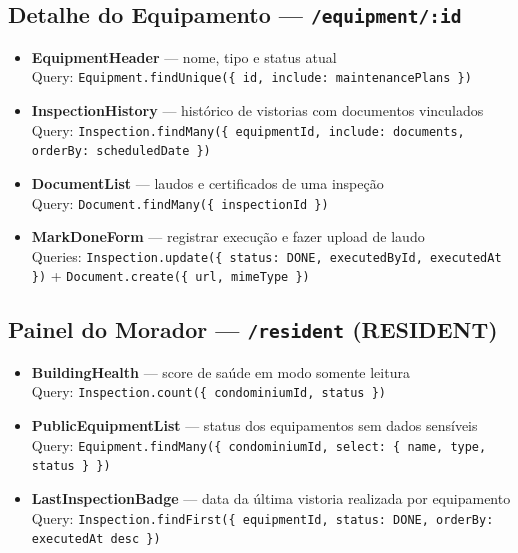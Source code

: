 \documentclass[12pt, a4paper]{article}
\begin{document}
\subsection{Detalhe do Equipamento — \texttt{/equipment/:id}}

\begin{itemize}[leftmargin=1.5em]
    \item \textbf{EquipmentHeader} — nome, tipo e status atual \\
          Query: \texttt{Equipment.findUnique(\{ id, include: maintenancePlans \})}
    \item \textbf{InspectionHistory} — histórico de vistorias com documentos vinculados \\
          Query: \texttt{Inspection.findMany(\{ equipmentId, include: documents, orderBy: scheduledDate \})}
    \item \textbf{DocumentList} — laudos e certificados de uma inspeção \\
          Query: \texttt{Document.findMany(\{ inspectionId \})}
    \item \textbf{MarkDoneForm} — registrar execução e fazer upload de laudo \\
          Queries: \texttt{Inspection.update(\{ status: DONE, executedById, executedAt \})} + \texttt{Document.create(\{ url, mimeType \})}
\end{itemize}

\subsection{Painel do Morador — \texttt{/resident} (RESIDENT)}

\begin{itemize}[leftmargin=1.5em]
    \item \textbf{BuildingHealth} — score de saúde em modo somente leitura \\
          Query: \texttt{Inspection.count(\{ condominiumId, status \})}
    \item \textbf{PublicEquipmentList} — status dos equipamentos sem dados sensíveis \\
          Query: \texttt{Equipment.findMany(\{ condominiumId, select: \{ name, type, status \} \})}
    \item \textbf{LastInspectionBadge} — data da última vistoria realizada por equipamento \\
          Query: \texttt{Inspection.findFirst(\{ equipmentId, status: DONE, orderBy: executedAt desc \})}
\end{itemize}
\end{document}

